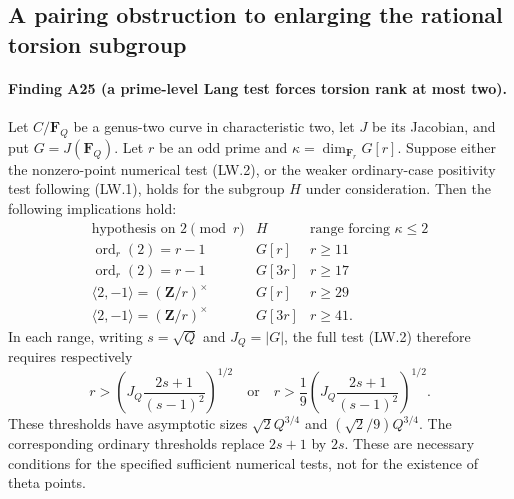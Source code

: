\subsection{A pairing obstruction to enlarging the rational torsion subgroup}
\label{sec:lang-pairing-rank-bound}

\paragraph{Finding A25 (a prime-level Lang test forces torsion rank at most two).}
Let $C/\mathbf F_Q$ be a genus-two curve in characteristic two,
let $J$ be its Jacobian, and put $G=J(\mathbf F_Q)$.
Let $r$ be an odd prime and
$\kappa=\dim_{\mathbf F_r}G[r]$.
Suppose either the nonzero-point numerical test (LW.2), or
the weaker ordinary-case positivity test following (LW.1),
holds for the subgroup $H$ under consideration.
Then the following implications hold:
\[
\begin{array}{c|c|c}
\text{hypothesis on }2\pmod r&H&\text{range forcing }\kappa\le2\\
\hline
\operatorname{ord}_r(2)=r-1&G[r]&r\ge11\\
\operatorname{ord}_r(2)=r-1&G[3r]&r\ge17\\
\langle2,-1\rangle=(\mathbf Z/r)^\times&G[r]&r\ge29\\
\langle2,-1\rangle=(\mathbf Z/r)^\times&G[3r]&r\ge41.
\end{array}
\tag{LP.1}
\]
In each range, writing $s=\sqrt Q$ and $J_Q=|G|$, the full
test (LW.2) therefore requires respectively
\[
 r>\left(J_Q\frac{2s+1}{(s-1)^2}\right)^{1/2}
 \quad\text{or}\quad
 r>\frac19\left(J_Q\frac{2s+1}{(s-1)^2}\right)^{1/2}.
\tag{LP.2}
\]
These thresholds have asymptotic sizes
$\sqrt2 Q^{3/4}$ and $(\sqrt2/9)Q^{3/4}$.
The corresponding ordinary thresholds replace $2s+1$ by $2s$.
These are necessary conditions for the specified sufficient
numerical tests, not for the existence of theta points.

